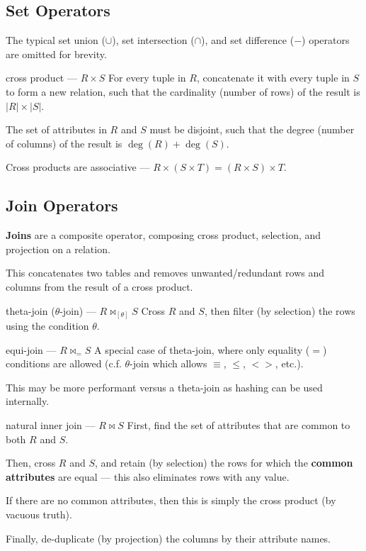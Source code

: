 \subsection{Set Operators}
The typical set union ($\cup$), set intersection ($\cap$), and set difference ($-$) operators are omitted for brevity.

\begin{defn}{cross product --- $R \times S$}
    For every tuple in $R$, concatenate it with every tuple in $S$ to form a new relation, such that the cardinality (number of rows) of the result is $|R| \times |S|$.

    The set of attributes in $R$ and $S$ must be disjoint, such that the degree (number of columns) of the result is $\operatorname*{deg}(R) + \operatorname*{deg}(S)$.

    Cross products are associative --- $R \times (S \times T) = (R \times S) \times T$.
\end{defn}

\subsection{Join Operators}
\textbf{Joins} are a composite operator, composing cross product, selection, and projection on a relation.

This concatenates two tables and removes unwanted/redundant rows and columns from the result of a cross product.

\begin{defn}{theta-join ($\theta$-join) --- $R \Join_{[\theta]} S$}
    Cross $R$ and $S$, then filter (by selection) the rows using the condition $\theta$.
\end{defn}

\begin{defn}{equi-join --- $R \Join_= S$}
    A special case of theta-join, where only equality ($=$) conditions are allowed (c.f. $\theta$-join which allows $\equiv$, $\le$, $<>$, etc.).

    This may be more performant versus a theta-join as hashing can be used internally.
\end{defn}

\begin{defn}{natural inner join --- $R \Join S$}
    First, find the set of attributes that are common to both $R$ and $S$.

    Then, cross $R$ and $S$, and retain (by selection) the rows for which the \textbf{common attributes} are equal --- this also eliminates rows with any  value.
    
    If there are no common attributes, then this is simply the cross product (by vacuous truth).

    Finally, de-duplicate (by projection) the columns by their attribute names.

\end{defn}

